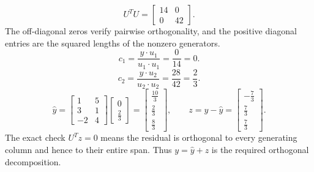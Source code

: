 \[U^TU=\left[\begin{array}{rr}14&0\\0&42\end{array}\right].\]
The off-diagonal zeros verify pairwise orthogonality, and the positive diagonal entries are the squared lengths of the nonzero generators.
\[c_{1}=\frac{y\cdot u_{1}}{u_{1}\cdot u_{1}}=\frac{0}{14}=0.\]
\[c_{2}=\frac{y\cdot u_{2}}{u_{2}\cdot u_{2}}=\frac{28}{42}=\frac{2}{3}.\]
\[\widehat y=\left[\begin{array}{rr}1&5\\3&1\\-2&4\end{array}\right]\left[\begin{array}{r}0\\\frac{2}{3}\end{array}\right]=\left[\begin{array}{r}\frac{10}{3}\\\frac{2}{3}\\\frac{8}{3}\end{array}\right],\qquad z=y-\widehat y=\left[\begin{array}{r}- \frac{7}{3}\\\frac{7}{3}\\\frac{7}{3}\end{array}\right].\]
The exact check $U^Tz=0$ means the residual is orthogonal to every generating column and hence to their entire span. Thus $y=\widehat y+z$ is the required orthogonal decomposition.


